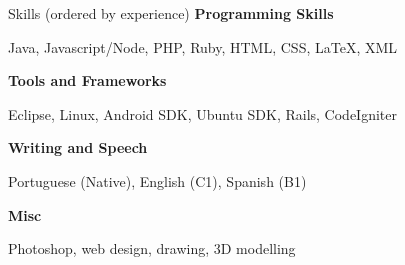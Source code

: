 
\begin{rubric}{Skills \small{(ordered by experience)}}
	\in{}
	\textbf{Programming Skills}
	
	Java, Javascript/Node, PHP, Ruby, HTML, CSS, \LaTeX, XML

	\in{}
	\textbf{Tools and Frameworks}

	Eclipse, Linux, Android SDK, Ubuntu SDK, Rails, CodeIgniter

	\in{}
	\textbf{Writing and Speech}

	Portuguese (Native), English (C1), Spanish (B1)

	\in{}
	\textbf{Misc}

	Photoshop, web design, drawing, 3D modelling
\end{rubric}
